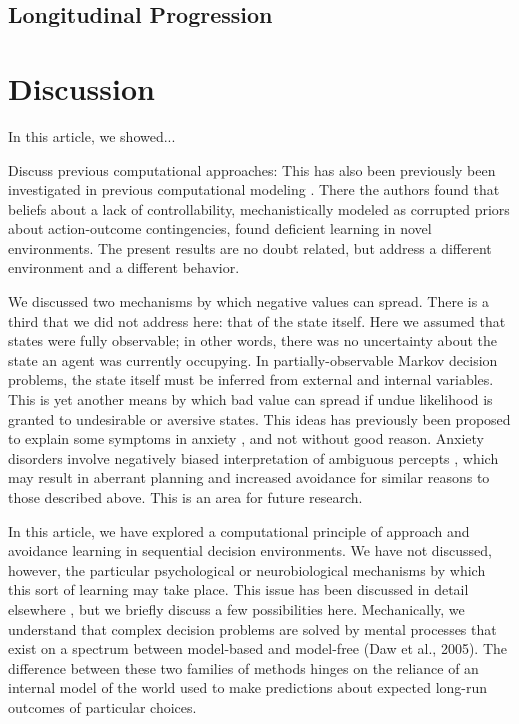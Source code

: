 \documentclass[11pt]{article} %
\begin{document}
\subsection{Longitudinal Progression}

\section{Discussion}

In this article, we showed...

Discuss previous computational approaches: This has also been previously been
investigated in previous computational modeling \citep{Huys2009}. There
the authors found that beliefs about a lack of controllability, mechanistically
modeled as corrupted priors about action-outcome contingencies, found deficient
learning in novel environments. The present results are no doubt related, but
address a different environment and a different behavior.

We discussed two mechanisms by which negative values can spread. There is a third
that we did not address here: that of the state itself. Here we assumed that states
were fully observable; in other words, there was no uncertainty about the state
an agent was currently occupying. In partially-observable Markov decision problems,
the state itself must be inferred from external and internal variables. This is
yet another means by which bad value can spread if undue likelihood is granted
to undesirable or aversive states. This ideas has previously been proposed to
explain some symptoms in anxiety \citep{Paulus2012}, and not without good reason.
Anxiety disorders involve negatively biased interpretation of ambiguous percepts
\citep{Hartley2012}, which may result in aberrant planning and increased avoidance
for similar reasons to those described above. This is an area for future research.

In this article, we have explored a computational principle of approach and
avoidance learning in sequential decision environments. We have not discussed,
however, the particular psychological or neurobiological mechanisms by which this
sort of learning may take place. This issue has been discussed in detail elsewhere
\citep{Bishop2018}, but we briefly discuss a few possibilities here. Mechanically,
we understand that complex decision problems are solved by mental processes that
exist on a spectrum between model-based and model-free (Daw et al., 2005). The
difference between these two families of methods hinges on the reliance of an
internal model of the world used to make predictions about expected long-run
outcomes of particular choices.
\end{document}
